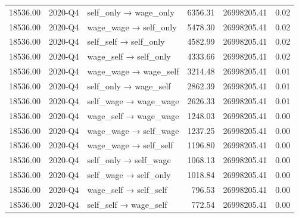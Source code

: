 \begin{table}[ht]
{\begin{tabular}{rllrrr}
  18536.00 & 2020-Q4 & self\_only → wage\_only & 6356.31 & 26998205.41 & 0.02 \\ 
  18536.00 & 2020-Q4 & wage\_wage → self\_only & 5478.30 & 26998205.41 & 0.02 \\ 
  18536.00 & 2020-Q4 & self\_self → self\_only & 4582.99 & 26998205.41 & 0.02 \\ 
  18536.00 & 2020-Q4 & wage\_self → self\_only & 4333.66 & 26998205.41 & 0.02 \\ 
  18536.00 & 2020-Q4 & wage\_wage → wage\_self & 3214.48 & 26998205.41 & 0.01 \\ 
  18536.00 & 2020-Q4 & self\_only → wage\_self & 2862.39 & 26998205.41 & 0.01 \\ 
  18536.00 & 2020-Q4 & self\_wage → wage\_wage & 2626.33 & 26998205.41 & 0.01 \\ 
  18536.00 & 2020-Q4 & wage\_self → wage\_wage & 1248.03 & 26998205.41 & 0.00 \\ 
  18536.00 & 2020-Q4 & wage\_wage → self\_wage & 1237.25 & 26998205.41 & 0.00 \\ 
  18536.00 & 2020-Q4 & wage\_wage → self\_self & 1196.80 & 26998205.41 & 0.00 \\ 
  18536.00 & 2020-Q4 & self\_only → self\_wage & 1068.13 & 26998205.41 & 0.00 \\ 
  18536.00 & 2020-Q4 & self\_wage → self\_only & 1018.84 & 26998205.41 & 0.00 \\ 
  18536.00 & 2020-Q4 & wage\_self → self\_self & 796.53 & 26998205.41 & 0.00 \\ 
  18536.00 & 2020-Q4 & self\_self → wage\_self & 772.54 & 26998205.41 & 0.00 \\ 
   \bottomrule
\end{tabular}
}
\endgroup
\end{table}
